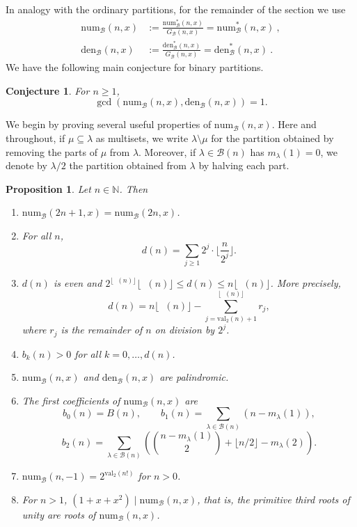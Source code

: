 \documentclass[reqno]{amsart}
\def\den{\mathrm{den}}
\def\num{\mathrm{num}}
\def\val{\mathrm{val}}
\def\N{\mathbb{N}}
\DeclareMathOperator{\lb}{\log_2}
\newtheorem{proposition}[theorem]{Proposition}
\newtheorem{conjecture}{Conjecture}
\theoremstyle{definition}
\begin{document}
   In analogy with the ordinary partitions, for the remainder of the section we use \begin{align*} \num_{\mathcal B}(n,x)& :=\frac{\num^*_{\mathcal B}(n,x)}{G_{\mathcal B}(n,x)}= \num^*_{\mathcal B}(n,x)\:,\\
   \den_{\mathcal B}(n,x)& :=\frac{\den^*_{\mathcal B}(n,x)}{G_{\mathcal B}(n,x)}= \den^*_{\mathcal B}(n,x)\:.\end{align*}
We have the following main conjecture for binary partitions. 
\begin{conjecture}\label{bin} For $n\geq 1$, $$\gcd(\num_{\mathcal B}(n,x), \den_{\mathcal B}(n,x))=1.$$
    \end{conjecture}

We begin by  proving several  useful properties of $\num_{\mathcal B}(n,x)$. Here and throughout, if $\mu \subseteq \lambda$ as multisets, we write $\lambda \setminus \mu$ for the partition obtained by removing the parts of $\mu$ from $\lambda$. Moreover, if $\lambda\in \mathcal B(n)$ has $m_\lambda(1)=0$, we denote by $\lambda/2$ the partition obtained from $\lambda$ by halving each part. 



\begin{proposition}\label{lem:binary-elementary}
Let $n\in\N$.
    Then
    \begin{enumerate}[label=(\alph*)]
    \item\label{odd} $\num_{\mathcal B}(2n+1,x)=\num_{\mathcal B}(2n,x)$.
    \item \label{d(n)} For all $n$,
    \[d(n)=\sum_{j\geq 1}2^j\cdot\lfloor\frac{n}{2^j}\rfloor.\]
    \item\label{even}
 $d(n)$ is even and  $2^{\lfloor \lb(n)\rfloor}\lfloor \lb(n)\rfloor\leq d(n)\leq n\lfloor \lb(n)\rfloor$. More precisely, $$d(n)=n\lfloor \lb(n)\rfloor-\sum_{j=\val_2(n)+1}^{\lfloor \lb(n)\rfloor}r_j,$$ where $r_j$ is the remainder of $n$ on division by $2^j$.
\item \label{b_k}  $b_k(n)>0$ for all $k=0,\ldots,d(n)$.
\item \label{numb pal} $\num_{\mathcal B}(n,x)$  and $\den_{\mathcal B}(n,x)$ are palindromic. 
\item \label{small_b} The first coefficients of $\num_{\mathcal B}(n,x)$ are
\[b_0(n)=B(n),\qquad b_1(n)
=\sum_{\lambda\in\mathcal B(n)}(n -m_\lambda(1)),\]
\[b_2(n)=\sum_{\lambda\in\mathcal B(n)}\left(\binom{n -m_\lambda(1)}{2} + {\lfloor n/2\rfloor -m_\lambda(2)} \right).\]
\item \label{B-1}
  $\num_\mathcal{B}(n, -1) =  2^{\val_2(n!)}$ for $n>0$. 
\item \label{prim} For  $n>1$, $(1+x+x^2)\mid\num_{\mathcal B}(n,x)$, that is, the primitive third roots of unity are roots of $\num_{\mathcal B}(n,x)$.
\end{enumerate}
\end{proposition}
\end{document}
